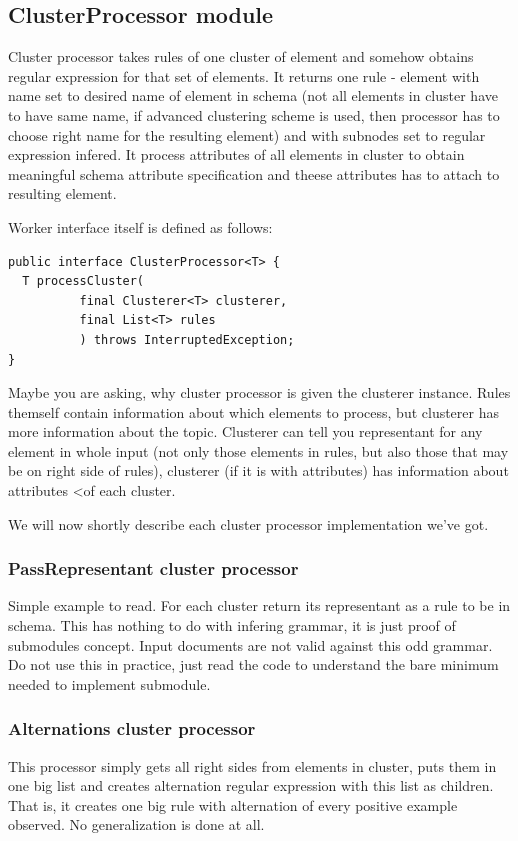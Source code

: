 \documentclass[a4paper,10pt,oneside]{article}
\begin{document}
\subsection{ClusterProcessor module}
Cluster processor takes rules of one cluster of element and somehow obtains regular expression for that set of elements. It returns one rule - element with name set to desired name of element in schema (not all elements in cluster have to have same name, if advanced clustering scheme is used, then processor has to choose right name for the resulting element) and with subnodes set to regular expression infered.
It process attributes of all elements in cluster to obtain meaningful schema attribute specification and theese attributes has to attach to resulting element.

Worker interface itself is defined as follows:
\begin{verbatim}
public interface ClusterProcessor<T> {
  T processCluster(
          final Clusterer<T> clusterer,
          final List<T> rules
          ) throws InterruptedException;
}
\end{verbatim}
Maybe you are asking, why cluster processor is given the clusterer instance.
Rules themself contain information about which elements to process, but clusterer has more information
about the topic.
Clusterer can tell you representant for any element in whole input (not only those elements in rules, but also those that may be on right side of rules), clusterer (if it is with attributes) has information about attributes <of each cluster.

We will now shortly describe each cluster processor implementation we've got.

\subsubsection{PassRepresentant cluster processor}
Simple example to read. For each cluster return its representant as a rule to be in schema.
This has nothing to do with infering grammar, it is just proof of submodules concept.
Input documents are not valid against this odd grammar.
Do not use this in practice, just read the code to understand the bare minimum needed to implement submodule.

\subsubsection{Alternations cluster processor}
This processor simply gets all right sides from elements in cluster, puts them in one big list and creates alternation regular expression with this list as children.
That is, it creates one big rule with alternation of every positive example observed.
No generalization is done at all.
\end{document}
